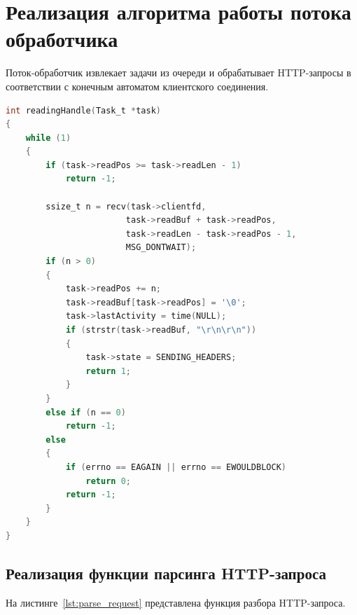 \section{Реализация алгоритма работы потока обработчика}
Поток-обработчик извлекает задачи из очереди и обрабатывает HTTP-запросы
в соответствии с конечным автоматом клиентского соединения.

\begin{lstlisting}[caption={Реализация функции чтения HTTP-запроса},label={lst:reading_handle},language=C]
int readingHandle(Task_t *task)
{
    while (1)
    {
        if (task->readPos >= task->readLen - 1)
            return -1;

        ssize_t n = recv(task->clientfd,
                        task->readBuf + task->readPos,
                        task->readLen - task->readPos - 1,
                        MSG_DONTWAIT);
        if (n > 0)
        {
            task->readPos += n;
            task->readBuf[task->readPos] = '\0';
            task->lastActivity = time(NULL);
            if (strstr(task->readBuf, "\r\n\r\n"))
            {
                task->state = SENDING_HEADERS;
                return 1;
            }
        }
        else if (n == 0)
            return -1;
        else
        {
            if (errno == EAGAIN || errno == EWOULDBLOCK)
                return 0;
            return -1;
        }
    }
}
\end{lstlisting}

\subsection{Реализация функции парсинга HTTP-запроса}
На листинге~\ref{lst:parse_request} представлена функция разбора HTTP-запроса.

